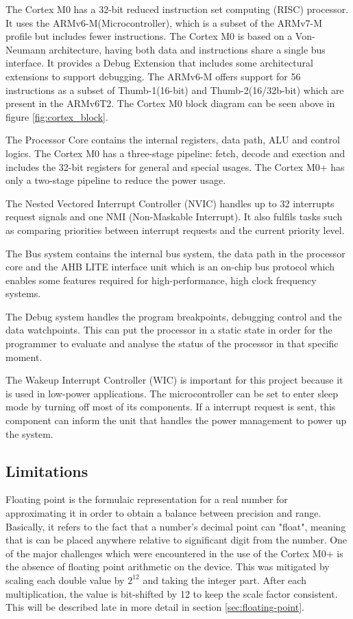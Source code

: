 The Cortex M0 has a 32-bit reduced instruction set computing (RISC) processor. It uses the ARMv6-M(Microcontroller), which is a subset of the ARMv7-M profile but includes fewer instructions. The Cortex M0 is based on a Von-Neumann architecture, having both data and instructions share a single bus interface. It provides a Debug Extension that includes some architectural extensions to support debugging. The ARMv6-M offers support for 56 instructions as a subset of  Thumb-1(16-bit) and Thumb-2(16/32b-bit) which are present in the ARMv6T2. The Cortex M0 block diagram can be seen above in figure \ref{fig:cortex_block}. 

The Processor Core contains the internal registers, data path, ALU and control logics. The Cortex M0 has a three-stage pipeline: fetch, decode and exection and includes the 32-bit registers for general and special usages. The Cortex M0+ has only a two-stage pipeline to reduce the power usage.

The Nested Vectored Interrupt Controller (NVIC) handles up to 32 interrupts request signals and one NMI (Non-Maskable Interrupt). It also fulfils tasks such as comparing priorities between  interrupt requests and the current priority level. 

The Bus system contains the internal bus system, the data path in the processor core and the AHB LITE interface unit which is an on-chip bus protocol which enables some features required for high-performance, high clock frequency systems. 

The Debug system handles the program breakpoints, debugging control and the data watchpoints. This can put the processor in a  static state in order for the programmer to evaluate and analyse the status of the processor in that specific moment.

The Wakeup Interrupt Controller (WIC) is important for this project because it is used in low-power applications. The microcontroller can be set to enter sleep mode by turning off most of its components. If a interrupt request is sent, this component can inform the unit that handles the power management to power up the system.

\subsection{Limitations \label{sec:cortex-limitations}}

Floating point is the formulaic representation for a real number for approximating it in order to obtain a balance between precision and range. Basically, it refers to the fact that a number's decimal point can "float", meaning  that is can be placed anywhere relative to significant digit from the number. One of the major challenges which were encountered in the use of the Cortex M0+ is the absence of floating point arithmetic on the device. This was mitigated by scaling each double value by $2^{12}$ and taking the integer part. After each multiplication, the value is bit-shifted by 12 to keep the scale factor consistent. This will be described late in more detail in section \ref{sec:floating-point}.


